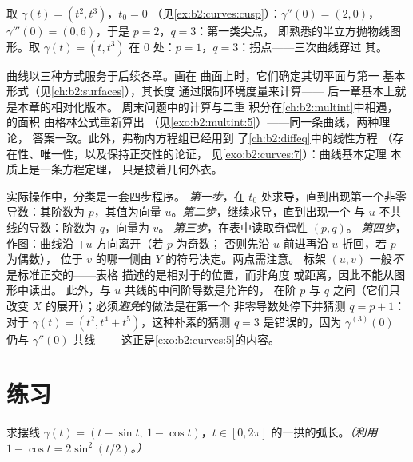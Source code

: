\begin{example}
取 $\gamma(t) = (t^2, t^3)$，$t_0 = 0$
（见\cref{ex:b2:curves:cusp}）：$\gamma'' (0)= (2, 0)$，$\gamma'''(0) =
(0, 6)$，于是 $p = 2$，$q = 3$：第一类尖点，
即熟悉的半立方抛物线图形。取 $\gamma(t) = (t,
t^3)$ 在 $0$ 处：$p = 1$，$q = 3$：拐点——三次曲线穿过
其。
\end{example}

\begin{remark}[本册内的展望]
曲线以三种方式服务于后续各章。画在
曲面上时，它们确定其切平面与第一
基本形式（见\cref{ch:b2:surfaces}），其长度
通过限制环境度量来计算——
后一章基本上就是本章的相对化版本。
周末问题中的计算与二重
积分在\cref{ch:b2:multint}中相遇，的面积
由格林公式重新算出
（见\cref{exo:b2:multint:5}）——同一条曲线，两种理论，
答案一致。此外，弗勒内方程组已经用到
了\cref{ch:b2:diffeq}中的线性方程
（存在性、唯一性，以及保持正交性的论证，
见\cref{exo:b2:curves:7}）：曲线基本定理
本质上是一条方程定理，
只是披着几何外衣。
\end{remark}

\begin{remark}[方法：局部分析的步骤]
实际操作中，分类是一套四步程序。
\emph{第一步}，在 $t_0$ 处求导，直到出现第一个非零
导数：其阶数为 $p$，其值为向量
$u$。\emph{第二步}，继续求导，直到出现一个
与 $u$ 不共线的导数：阶数为 $q$，向量为 $v$。
\emph{第三步}，在表中读取奇偶性 $(p, q)$。
\emph{第四步}，作图：曲线沿 $+u$ 方向离开（若 $p$ 为奇数；
否则先沿 $u$ 前进再沿 $u$ 折回，若 $p$ 为偶数），
位于 $v$ 的哪一侧由 $Y$ 的符号决定。两点需注意。
标架 $(u, v)$ 一般\emph{不}是标准正交的——表格
描述的是相对于的位置，而非角度
或距离，因此不能从图形中读出。
此外，与 $u$ 共线的中间阶导数是允许的，
在阶 $p$ 与 $q$ 之间（它们只改变
$X$ 的展开）；必须\emph{避免}的做法是在第一个
非零导数处停下并猜测 $q = p + 1$：对于 $\gamma(t)
= (t^2, t^4 + t^5)$，这种朴素的猜测 $q = 3$ 是错误的，因为
$\gamma^{(3)}(0)$ 仍与 $\gamma''(0)$ 共线——
这正是\cref{exo:b2:curves:5}的内容。
\end{remark}

\section{练习}

\begin{exercise}[$\star$]\label{exo:b2:curves:1}
求摆线 $\gamma(t) = (t -
\sin t,\ 1 - \cos t)$，$t \in [0, 2\pi]$ 的一拱的弧长。\emph{（利用 $1 - \cos t =
2\sin^2(t/2)$。）}
\end{exercise}


